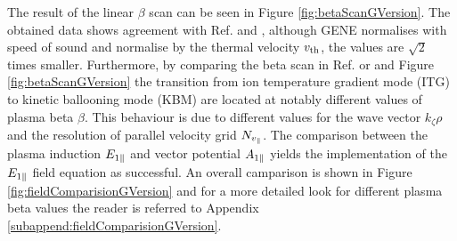 The result of the linear $\beta$ scan can be seen in Figure \ref{fig:betaScanGVersion}. The obtained data shows agreement with Ref.  and , although GENE normalises with speed of sound and {\gkw} normalise by the thermal velocity $v_\mathrm{th}$, the values are $\sqrt{2}$ times smaller. Furthermore, by comparing the beta scan in Ref.  or  and Figure \ref{fig:betaScanGVersion} the transition from ion temperature gradient mode (ITG) to kinetic ballooning mode (KBM) are located at notably different values of plasma beta $\beta$. This behaviour is due to different values for the wave vector $k_\zeta \rho$ and the resolution of parallel velocity grid $N_{v_\parallel}$. The comparison between the plasma induction $E_{1\parallel}$ and vector potential $A_{1\parallel}$ yields the implementation of the $E_{1\parallel}$ field equation as successful. An overall camparison is shown in Figure \ref{fig:fieldComparisionGVersion} and for a more detailed look for different plasma beta values the reader is referred to Appendix \ref{subappend:fieldComparisionGVersion}.



\newpage